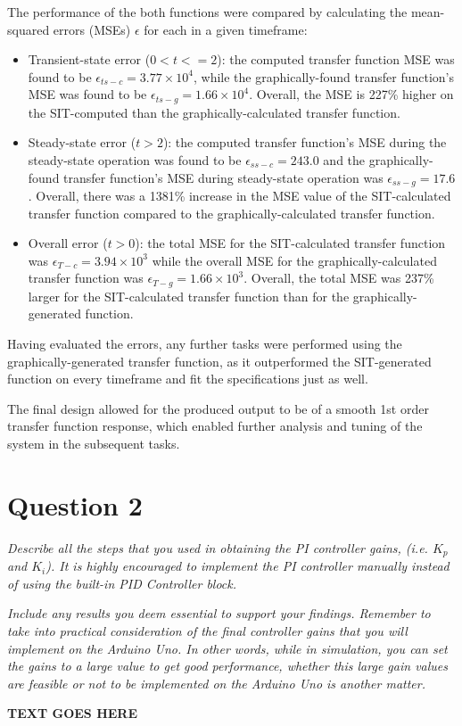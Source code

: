 \documentclass[11pt, onecolumn]{article}
\begin{document}
\par The performance of the both functions were compared by calculating the mean-squared errors (MSEs) $\epsilon$ for each in a given timeframe:
\begin{itemize}
    \item Transient-state error ($0 < t <= 2$): the computed transfer function MSE was found to be $\epsilon_{ts-c} = 3.77 \times 10^4$, while the graphically-found transfer function's MSE was found to be $\epsilon_{ts-g} = 1.66 \times 10^4$. Overall, the MSE is 227\% higher on the SIT-computed than the graphically-calculated transfer function.
    \item Steady-state error ($t > 2$): the computed transfer function's MSE during the steady-state operation was found to be $\epsilon_{ss-c} = 243.0$ and the graphically-found transfer function's MSE during steady-state operation was $\epsilon_{ss-g} = 17.6$. Overall, there was a 1381\% increase in the MSE value of the SIT-calculated transfer function compared to the graphically-calculated transfer function.
    \item Overall error ($t > 0$): the total MSE for the SIT-calculated transfer function was $\epsilon_{T-c}=3.94\times10^{3}$ while the overall MSE for the graphically-calculated transfer function was $\epsilon_{T-g}=1.66\times10^{3}$. Overall, the total MSE was 237\% larger for the SIT-calculated transfer function than for the graphically-generated function.
\end{itemize}
\par Having evaluated the errors, any further tasks were performed using the graphically-generated transfer function, as it outperformed the SIT-generated function on every timeframe and fit the specifications just as well.
\par The final design allowed for the produced output to be of a smooth 1st order transfer function response, which enabled further analysis and tuning of the system in the subsequent tasks.
\section*{Question 2}
\par \textit{Describe all the steps that you used in obtaining the PI controller gains, (i.e. $K_p$ and $K_i$). It is highly encouraged to implement the PI controller manually instead of using the built-in PID Controller block.}
\par \textit{Include any results you deem essential to support your findings. Remember to take into practical consideration of the final controller gains that you will implement on the Arduino Uno. In other words, while in simulation, you can set the gains to a large value to get good performance, whether this large gain values are feasible or not to be implemented on the Arduino Uno is another matter.}
\noindent\makebox[\linewidth]{\rule{\textwidth}{0.4pt}}
\par \textbf{TEXT GOES HERE}
\end{document}
